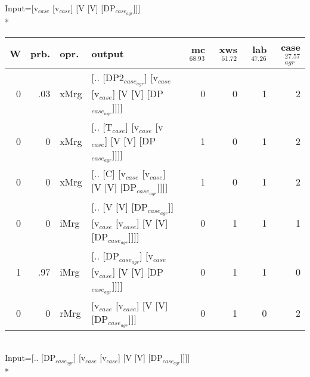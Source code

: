 \begingroup\scriptsize Input=[v$_{case}$ [v$_{case}$] [V [V] [DP$_{case_{agr}}$]]]\\*
\begin{tabularx}{\linewidth}{rrlXrrrr}
\hline
   W &   prb. & opr.   & output                                                             &   mc$^{68.93}$ &   xws$^{51.72}$ &   lab$^{47.26}$ &   case$_{agr}^{27.57}$ \\
\hline
   0 &   .03 & xMrg & [.. [DP2$_{case_{agr}}$] [v$_{case}$ [v$_{case}$] [V [V] [DP$_{case_{agr}}$]]]]        &            0 &             0 &             1 &                  2 \\
   0 &   0 & xMrg & [.. [T$_{case}$] [v$_{case}$ [v$_{case}$] [V [V] [DP$_{case_{agr}}$]]]]              &            1 &             0 &             1 &                  2 \\
   0 &   0 & xMrg & [.. [C] [v$_{case}$ [v$_{case}$] [V [V] [DP$_{case_{agr}}$]]]]                   &            1 &             0 &             1 &                  2 \\
   0 &   0 & iMrg & [.. [V [V] [DP$_{case_{agr}}$]] [v$_{case}$ [v$_{case}$] [V [V] [DP$_{case_{agr}}$]]]] &            0 &             1 &             1 &                  1 \\
   1 &   .97 & iMrg & [.. [DP$_{case_{agr}}$] [v$_{case}$ [v$_{case}$] [V [V] [DP$_{case_{agr}}$]]]]         &            0 &             1 &             1 &                  0 \\
   0 &   0 & rMrg & [v$_{case}$ [v$_{case}$] [V [V] [DP$_{case_{agr}}$]]]                            &            0 &             1 &             0 &                  2 \\
\hline
\end{tabularx}\endgroup\\
\begingroup\scriptsize Input=[.. [DP$_{case_{agr}}$] [v$_{case}$ [v$_{case}$] [V [V] [DP$_{case_{agr}}$]]]]\\*
